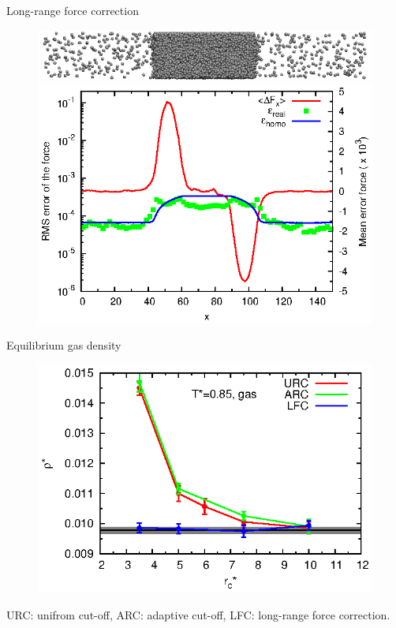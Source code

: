 \documentclass{beamer}
\begin{document}
\begin{frame}{Long-range force correction}
  \begin{figure}
    \centering
    \includegraphics[scale=1]{figs/t0.85-n16000-rc07.5uni/confout-02.eps}\\
    \includegraphics[]{figs/t0.85-n16000-fcorr-rc07.5-feq0200/fcorr-and-error.eps}
  \end{figure}
\end{frame}

\begin{frame}{Equilibrium gas density}
  \begin{figure}
    \centering
    \includegraphics[]{figs/converge.new/t0p85-gas.eps} 
  \end{figure}
  URC: unifrom cut-off, ARC: adaptive cut-off, LFC: long-range force correction.
\end{frame}
\end{document}
